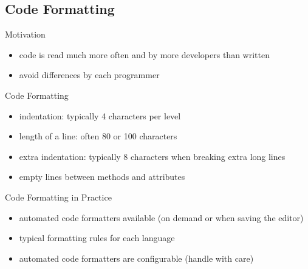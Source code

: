 \subsection{Code Formatting}
\begin{frame}{\insertsubsection}
	\begin{fancycolumns}
		\begin{note}{Motivation}
			\begin{itemize}
				\item code is read much more often and by more developers than written
				\item avoid differences by each programmer
			\end{itemize}
		\end{note} %
		\begin{definition}{Code Formatting}
			\begin{itemize}
				\item indentation: typically 4 characters per level
				\item length of a line: often 80 or 100 characters
				\item extra indentation: typically 8 characters when breaking extra long lines
				\item empty lines between methods and attributes
			\end{itemize}
		\end{definition} %
	\nextcolumn
		\begin{example}{Code Formatting in Practice}
			\begin{itemize}
				\item automated code formatters available (on demand or when saving the editor)
				\item typical formatting rules for each language
				\item automated code formatters are configurable (handle with care)
			\end{itemize}
		\end{example} %
	\end{fancycolumns}
\end{frame}


